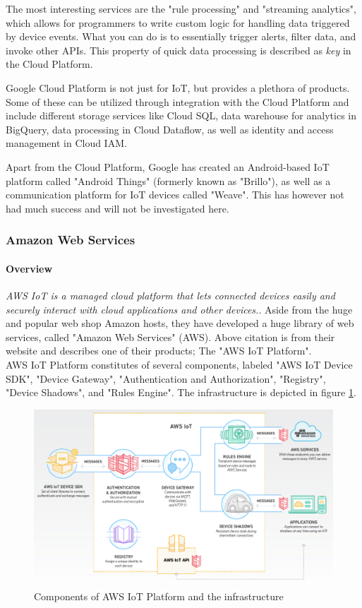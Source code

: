 The most interesting services are the "rule processing" and "streaming analytics", which allows for programmers to write custom logic for handling data triggered by device events. What you can do is to essentially trigger alerts, filter data, and invoke other APIs. This property of quick data processing is described as \textit{key} in the Cloud Platform. 

Google Cloud Platform is not just for IoT, but provides a plethora of products. Some of these can be utilized through integration with the Cloud Platform and include different storage services like Cloud SQL, data warehouse for analytics in BigQuery, data processing in Cloud Dataflow, as well as identity and access management in Cloud IAM.

Apart from the Cloud Platform, Google has created an Android-based IoT platform called "Android Things" (formerly known as "Brillo"), as well as a communication platform for IoT devices called "Weave". This has however not had much success and will not be investigated here.


\subsubsection{Amazon Web Services}
\paragraph{Overview} \textit{AWS IoT is a managed cloud platform that lets connected devices easily and securely interact with cloud applications and other devices.}\cite{website:aws}.
Aside from the huge and popular web shop Amazon hosts, they have developed a huge library of web services, called "Amazon Web Services" (AWS). Above citation is from their website and describes one of their products; The "AWS IoT Platform". \\

AWS IoT Platform constitutes of several components, labeled "AWS IoT Device SDK", "Device Gateway", "Authentication and Authorization", "Registry", "Device Shadows", and "Rules Engine". The infrastructure is depicted in figure \ref{fig:aws:infrastructure}. \\

\begin{figure}[h!]
	\centering
	\includegraphics[width=\textwidth]{figures/aws/infrastructure.png}
	\caption{Components of AWS IoT Platform and the infrastructure}
	\label{fig:aws:infrastructure}
\end{figure}

